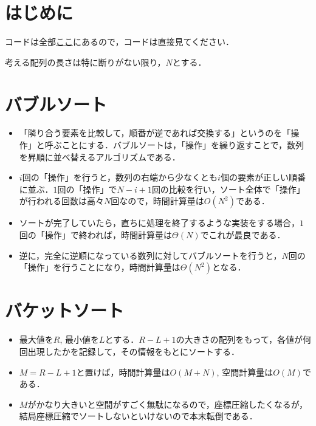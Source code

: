 \documentclass[slide,20pt]{ltjsarticle}
\begin{document}
\pagestyle{fancy}
\fancyhf{} %
\fancyfoot[C]{} %
\renewcommand{\headrulewidth}{0pt} %

\tableofcontents
\newpage

\pagestyle{plain}

\setcounter{page}{2}

\section{はじめに}

コードは全部\textcolor{red}{\href{https://github.com/kk2a/algo_data}{ここ}}にあるので，コードは直接見てください．

考える配列の長さは特に断りがない限り，$N$とする．

\section{バブルソート}

\begin{itemize}
  \item 「隣り合う要素を比較して，順番が逆であれば交換する」というのを「操作」と呼ぶことにする．バブルソートは，「操作」を繰り返すことで，数列を昇順に並べ替えるアルゴリズムである．
  \item $i$回の「操作」を行うと，数列の右端から少なくとも$i$個の要素が正しい順番に並ぶ．$1$回の「操作」で$N - i + 1$回の比較を行い，ソート全体で「操作」が行われる回数は高々$N$回なので，時間計算量は$O(N ^ 2)$である．
  \item ソートが完了していたら，直ちに処理を終了するような実装をする場合，$1$回の「操作」で終われば，時間計算量は$\Theta(N)$でこれが最良である．
  \item 逆に，完全に逆順になっている数列に対してバブルソートを行うと，$N$回の「操作」を行うことになり，時間計算量は$\Theta(N ^ 2)$となる．
\end{itemize}

\section{バケットソート}

\begin{itemize}
  \item 最大値を$R$, 最小値を$L$とする．$R - L + 1$の大きさの配列をもって，各値が何回出現したかを記録して，その情報をもとにソートする．
  \item $M = R - L + 1$と置けば，時間計算量は$O(M + N)$, 空間計算量は$O(M)$である．
  \item $M$がかなり大きいと空間がすごく無駄になるので，座標圧縮したくなるが，結局座標圧縮でソートしないといけないので本末転倒である．
\end{itemize}
\end{document}
